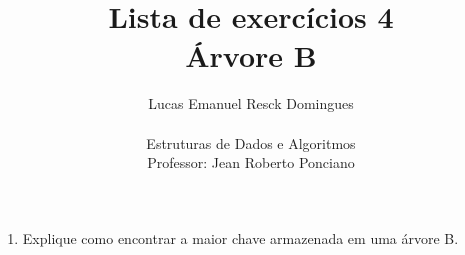 \documentclass{article}
\title{Lista de exercícios 4 \\
\large Árvore B}
\author{Lucas Emanuel Resck Domingues \\ \\
Estruturas de Dados e Algoritmos \\
Professor: Jean Roberto Ponciano}
\begin{document}
    \maketitle

    \begin{enumerate}
        \item Explique como encontrar a maior chave armazenada em uma árvore B.
        
        \bigskip
        
        
    \end{enumerate}
\end{document}
